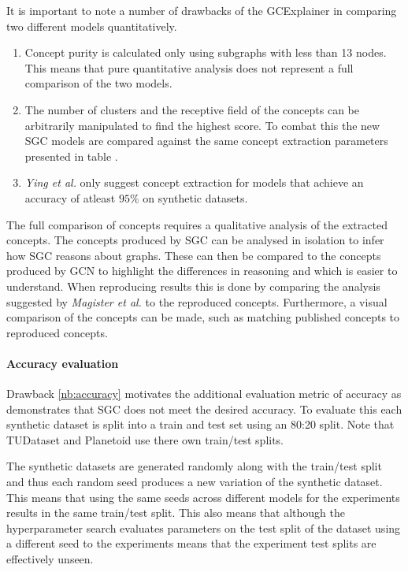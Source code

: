 It is important to note a number of drawbacks of the GCExplainer in comparing two different models quantitatively.
\begin{enumerate}
    \item 
        Concept purity is calculated only using subgraphs with less than 13 nodes.
        This means that pure quantitative analysis does not represent a full comparison of the two models.
    \item 
        The number of clusters and the receptive field of the concepts can be arbitrarily manipulated to find the highest score.
        To combat this the new SGC models are compared against the same concept extraction parameters presented in table .
    \item 
        \label{nb:accuracy}
        \textit{Ying et al.}\cite{ying2019gnnexplainer} only suggest concept extraction for models that achieve an accuracy of atleast $95\%$ on synthetic datasets. 
\end{enumerate}

The full comparison of concepts requires a qualitative analysis of the extracted concepts.
The concepts produced by SGC can be analysed in isolation to infer how SGC reasons about graphs.
These can then be compared to the concepts produced by GCN to highlight the differences in reasoning and which is easier to understand.
When reproducing results this is done by comparing the analysis suggested by \textit{Magister et al.}\cite{magister2021gcexplainer} to the reproduced concepts.
Furthermore, a visual comparison of the concepts can be made, such as matching published concepts to reproduced concepts.

\paragraph{Accuracy evaluation}
Drawback \ref{nb:accuracy} motivates the additional evaluation metric of accuracy as  demonstrates that SGC does not meet the desired accuracy.
To evaluate this each synthetic dataset is split into a train and test set using an 80:20 split.
Note that TUDataset and Planetoid use there own train/test splits.

The synthetic datasets are generated randomly along with the train/test split and thus each random seed produces a new variation of the synthetic dataset.
This means that using the same seeds across different models for the experiments results in the same train/test split.
This also means that although the hyperparameter search evaluates parameters on the test split of the dataset using a different seed to the experiments means that the experiment test splits are effectively unseen.


